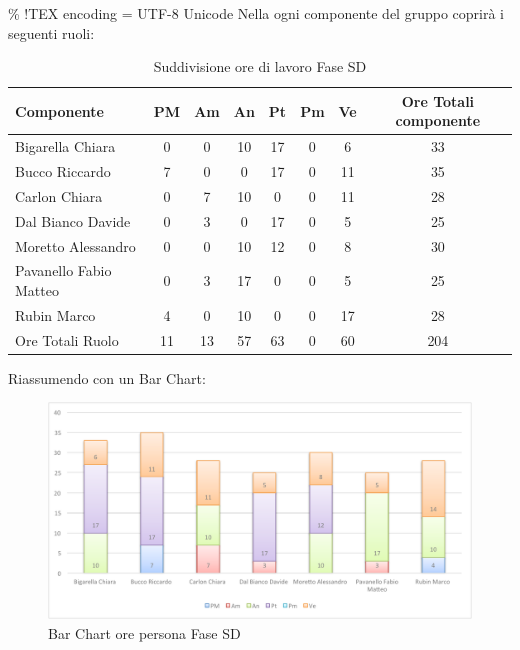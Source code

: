 \% !TEX encoding = UTF-8 Unicode
				Nella  ogni componente del gruppo \groupname{} coprirà i seguenti ruoli:
				\begin{table}[H]
					\begin{center}
						\begin{tabular}{| l | c | c | c | c | c | c | c |}
							\hline
							Componente 					& PM	& Am	 & An 		& Pt 		& Pm 	& Ve 	& Ore Totali componente \\ \hline
							
							Bigarella Chiara 			& 0		& 0		& 10 		& 17 		& 0		& 6 		& 33 \\
							Bucco Riccardo 				& 7 	& 0		& 0			& 17 		& 0		& 11 		& 35 \\
							Carlon Chiara	 			& 0		& 7 	& 10 		& 0			& 0		& 11 		& 28 \\
							Dal Bianco Davide 			& 0		& 3		& 0			& 17 		& 0		& 5			& 25 \\
							Moretto Alessandro 			& 0		& 0 	& 10 		& 12 		& 0		& 8 		& 30 \\
							Pavanello Fabio Matteo	 	& 0		& 3		& 17 		& 0			& 0		& 5			& 25 \\
							Rubin Marco					& 4 	& 0		& 10 		& 0			& 0		& 17 		& 28 \\ \hline \hline
							
							Ore Totali Ruolo 			& 11 	& 13 	& 57 		& 63 		& 0		& 60		& 204\\ \hline
						\end{tabular}
					\end{center}
					\caption{Suddivisione ore di lavoro Fase SD}
				\end{table}
				Riassumendo con un Bar Chart:
				\begin{figure}[H]\centering
					\includegraphics[width=\textwidth]{PianoDiProgetto/Pics/ChartOreFaseSD.pdf}
					\caption{Bar Chart ore persona Fase SD}
				\end{figure}
